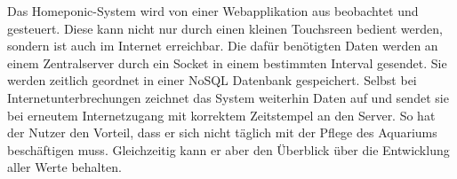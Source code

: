 Das Homeponic-System wird von einer Webapplikation aus beobachtet und gesteuert. Diese kann nicht nur durch einen kleinen Touchsreen bedient werden, sondern ist auch im Internet erreichbar. Die dafür benötigten Daten werden an einem Zentralserver durch ein Socket in einem bestimmten Interval gesendet. Sie werden zeitlich geordnet in einer NoSQL Datenbank gespeichert. Selbst bei Internetunterbrechungen zeichnet das System weiterhin Daten auf und sendet sie bei erneutem Internetzugang mit korrektem Zeitstempel an den Server. So hat der Nutzer den Vorteil, dass er sich nicht täglich mit der Pflege des Aquariums beschäftigen muss. Gleichzeitig kann er aber den Überblick über die Entwicklung aller Werte behalten. \\ \mbox{} \\ 

\afterpage{\blankpage}